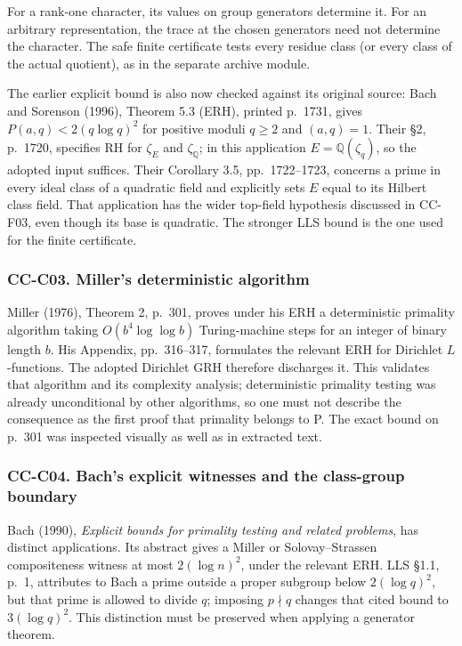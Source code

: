 For a rank-one character, its values on group generators determine it.
For an arbitrary representation, the trace at the chosen generators need
not determine the character. The safe finite certificate tests every
residue class (or every class of the actual quotient), as in the
separate archive module.

The earlier explicit bound is also now checked against its original
source: Bach and Sorenson (1996), Theorem 5.3 (ERH), printed p.~1731,
gives \(P(a,q)<2(q\log q)^2\) for positive moduli \(q\ge2\) and
\((a,q)=1\). Their §2, p.~1720, specifies RH for \(\zeta_E\) and
\(\zeta_{\mathbb Q}\); in this application \(E=\mathbb Q(\zeta_q)\), so
the adopted input suffices. Their Corollary 3.5, pp.~1722--1723,
concerns a prime in every ideal class of a quadratic field and
explicitly sets \(E\) equal to its Hilbert class field. That application
has the wider top-field hypothesis discussed in CC-F03, even though its
base is quadratic. The stronger LLS bound is the one used for the finite
certificate.

\subsubsection{CC-C03. Miller's deterministic
algorithm}\label{cc-c03.-millers-deterministic-algorithm}

Miller (1976), Theorem 2, p.~301, proves under his ERH a deterministic
primality algorithm taking \(O(b^4\log\log b)\) Turing-machine steps for
an integer of binary length \(b\). His Appendix, pp.~316--317,
formulates the relevant ERH for Dirichlet \(L\)-functions. The adopted
Dirichlet GRH therefore discharges it. This validates that algorithm and
its complexity analysis; deterministic primality testing was already
unconditional by other algorithms, so one must not describe the
consequence as the first proof that primality belongs to P. The exact
bound on p.~301 was inspected visually as well as in extracted text.

\subsubsection{CC-C04. Bach's explicit witnesses and the class-group
boundary}\label{cc-c04.-bachs-explicit-witnesses-and-the-class-group-boundary}

Bach (1990), \emph{Explicit bounds for primality testing and related
problems}, has distinct applications. Its abstract gives a Miller or
Solovay--Strassen compositeness witness at most \(2(\log n)^2\), under
the relevant ERH. LLS §1.1, p.~1, attributes to Bach a prime outside a
proper subgroup below \(2(\log q)^2\), but that prime is allowed to
divide \(q\); imposing \(p\nmid q\) changes that cited bound to
\(3(\log q)^2\). This distinction must be preserved when applying a
generator theorem.

